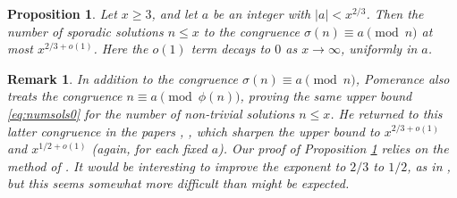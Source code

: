 \documentclass[12pt]{amsart}
\newtheorem*{rmk}{Remark}
\newtheorem{prop}{Proposition}
\begin{document}
\begin{prop}\label{prop:sigmacongruence} Let $x\geq 3$, and let $a$ be an integer with $|a| < x^{2/3}$. Then the number of sporadic solutions $n\leq x$ to the congruence $\sigma(n) \equiv a \pmod{n}$ at most $x^{2/3+o(1)}$. Here the $o(1)$ term decays to $0$ as $x\to\infty$, uniformly in $a$.
\end{prop}

\begin{rmk} In addition to the congruence $\sigma(n)\equiv a\pmod{n}$, Pomerance \cite{pomerance75} also treats the congruence $n \equiv a\pmod{\phi(n)}$, proving the same upper bound \eqref{eq:numsols0} for the number of non-trivial solutions $n \leq x$. He returned to this latter congruence in the papers \cite{pomerance76}, \cite{pomerance77}, which sharpen the upper bound to $x^{2/3+o(1)}$ and $x^{1/2+o(1)}$ (again, for each fixed $a$). Our proof of Proposition \ref{prop:sigmacongruence} relies on the method of \cite{pomerance76}. It would be interesting to improve the exponent to $2/3$ to $1/2$, as in \cite{pomerance77}, but this seems somewhat more difficult than might be expected.
\end{rmk}
\end{document}

